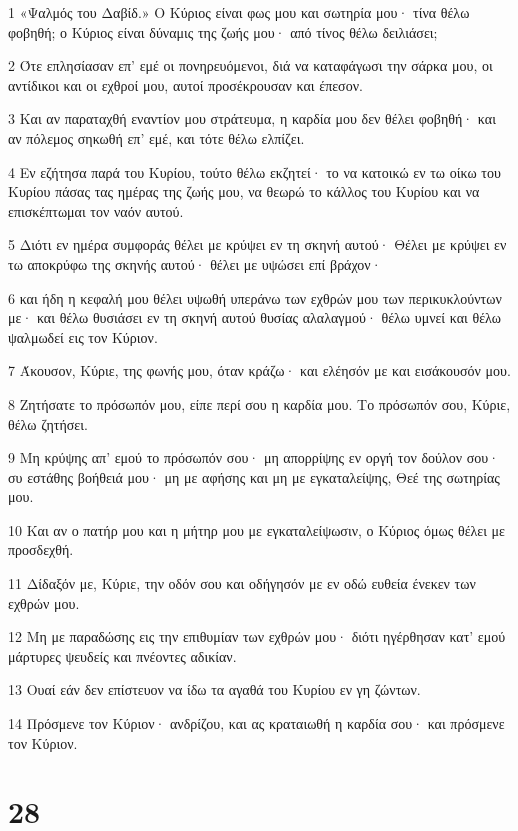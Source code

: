 \par 1 «Ψαλμός του Δαβίδ.» Ο Κύριος είναι φως μου και σωτηρία μου· τίνα θέλω φοβηθή; ο Κύριος είναι δύναμις της ζωής μου· από τίνος θέλω δειλιάσει;
\par 2 Ότε επλησίασαν επ' εμέ οι πονηρευόμενοι, διά να καταφάγωσι την σάρκα μου, οι αντίδικοι και οι εχθροί μου, αυτοί προσέκρουσαν και έπεσον.
\par 3 Και αν παραταχθή εναντίον μου στράτευμα, η καρδία μου δεν θέλει φοβηθή· και αν πόλεμος σηκωθή επ' εμέ, και τότε θέλω ελπίζει.
\par 4 Εν εζήτησα παρά του Κυρίου, τούτο θέλω εκζητεί· το να κατοικώ εν τω οίκω του Κυρίου πάσας τας ημέρας της ζωής μου, να θεωρώ το κάλλος του Κυρίου και να επισκέπτωμαι τον ναόν αυτού.
\par 5 Διότι εν ημέρα συμφοράς θέλει με κρύψει εν τη σκηνή αυτού· Θέλει με κρύψει εν τω αποκρύφω της σκηνής αυτού· θέλει με υψώσει επί βράχον·
\par 6 και ήδη η κεφαλή μου θέλει υψωθή υπεράνω των εχθρών μου των περικυκλούντων με· και θέλω θυσιάσει εν τη σκηνή αυτού θυσίας αλαλαγμού· θέλω υμνεί και θέλω ψαλμωδεί εις τον Κύριον.
\par 7 Άκουσον, Κύριε, της φωνής μου, όταν κράζω· και ελέησόν με και εισάκουσόν μου.
\par 8 Ζητήσατε το πρόσωπόν μου, είπε περί σου η καρδία μου. Το πρόσωπόν σου, Κύριε, θέλω ζητήσει.
\par 9 Μη κρύψης απ' εμού το πρόσωπόν σου· μη απορρίψης εν οργή τον δούλον σου· συ εστάθης βοήθειά μου· μη με αφήσης και μη με εγκαταλείψης, Θεέ της σωτηρίας μου.
\par 10 Και αν ο πατήρ μου και η μήτηρ μου με εγκαταλείψωσιν, ο Κύριος όμως θέλει με προσδεχθή.
\par 11 Δίδαξόν με, Κύριε, την οδόν σου και οδήγησόν με εν οδώ ευθεία ένεκεν των εχθρών μου.
\par 12 Μη με παραδώσης εις την επιθυμίαν των εχθρών μου· διότι ηγέρθησαν κατ' εμού μάρτυρες ψευδείς και πνέοντες αδικίαν.
\par 13 Ουαί εάν δεν επίστευον να ίδω τα αγαθά του Κυρίου εν γη ζώντων.
\par 14 Πρόσμενε τον Κύριον· ανδρίζου, και ας κραταιωθή η καρδία σου· και πρόσμενε τον Κύριον.

\chapter{28}

